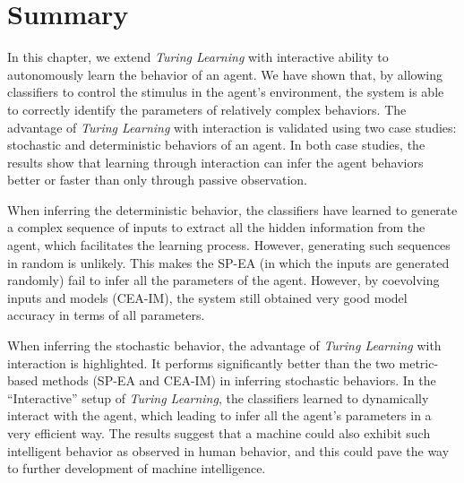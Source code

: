 \section{Summary}\label{sec:summary_interaction}


In this chapter, we extend \textit{Turing Learning} with interactive ability to autonomously learn the behavior of an agent. We have shown that, by allowing classifiers to control the stimulus in the agent's environment, the system is able to correctly identify the parameters of relatively complex behaviors. The advantage of \textit{Turing Learning} with interaction is validated using two case studies: stochastic and deterministic behaviors of an agent. In both case studies, the results show that learning through interaction can infer the agent behaviors better or faster than only through passive observation. 

When inferring the deterministic behavior, the classifiers have learned to generate a complex sequence of inputs to extract all the hidden information from the agent, which facilitates the learning process. However, generating such sequences in random is unlikely. This makes the SP-EA (in which the inputs are generated randomly) fail to infer all the parameters of the agent. However, by coevolving inputs and models (CEA-IM), the system still obtained very good model accuracy in terms of all parameters. 

When inferring the stochastic behavior, the advantage of \textit{Turing Learning} with interaction is highlighted. 
It performs significantly better than the two metric-based methods (SP-EA and CEA-IM) in inferring stochastic behaviors. In the ``Interactive'' setup of \textit{Turing Learning}, the classifiers learned to dynamically interact with the agent, which leading to infer all the agent's parameters in a very efficient way. The results suggest that a machine could also exhibit such intelligent behavior as observed in human behavior, and this could pave the way to further development of machine intelligence. 

